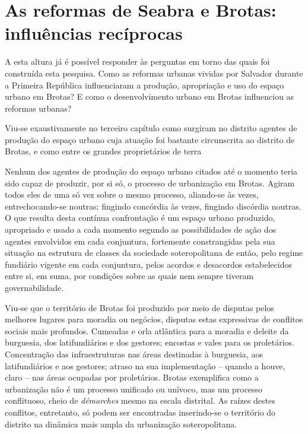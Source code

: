 \section[As reformas de Seabra e Brotas: influências recíprocas]{As reformas de Seabra e Brotas: influências recíprocas}\label{subsec:3.3.4}

A esta altura já é possível responder às perguntas em torno das quais foi construída esta pesquisa. Como as reformas urbanas vividas por Salvador durante a Primeira República influenciaram a produção, apropriação e uso do espaço urbano em Brotas? E como o desenvolvimento urbano em Brotas influenciou as reformas urbanas?

Viu-se exaustivamente no terceiro capítulo como surgiram no distrito agentes de produção do espaço urbano cuja atuação foi bastante circunscrita ao distrito de Brotas, e como entre os grandes proprietários de terra

Nenhum dos agentes de produção do espaço urbano citados até o momento teria sido capaz de produzir, por si só, o processo de urbanização em Brotas. Agiram todos eles de uma só vez sobre o mesmo processo, aliando-se às vezes, entrechocando-se noutras; fingindo concórdia às vezes, fingindo discórdia noutras. O que resulta desta contínua confrontação é um espaço urbano produzido, apropriado e usado a cada momento segundo as possibilidades de ação dos agentes envolvidos em cada conjuntura, fortemente constrangidas pela sua situação na estrutura de classes da sociedade soteropolitana de então, pelo regime fundiário vigente em cada conjuntura, pelos acordos e desacordos estabelecidos entre si, em suma, por condições sobre as quais nem sempre tiveram governabilidade.

Viu-se que o território de Brotas foi produzido por meio de disputas pelos melhores lugares para moradia ou negócios, disputas estas expressivas de conflitos sociais mais profundos. Cumeadas e orla atlântica para a moradia e deleite da burguesia, dos latifundiários e dos gestores; encostas e vales para os proletários. Concentração das infraestruturas nas áreas destinadas à burguesia, aos latifundiários e aos gestores; atraso na sua implementação – quando a houve, claro – nas áreas ocupadas por proletários. Brotas exemplifica como a urbanização não é um processo unificado ou unívoco, mas um processo conflituoso, cheio de \textit{démarches} mesmo na escala distrital. As raízes destes conflitos, entretanto, só podem ser encontradas inserindo-se o território do distrito na dinâmica mais ampla da urbanização soteropolitana.

